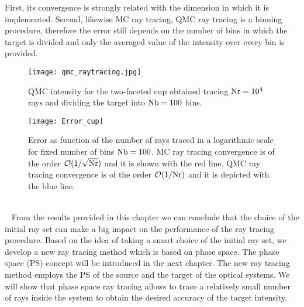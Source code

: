 First, its convergence is strongly related with the dimension in which it is implemented.
Second, likewise MC ray tracing, QMC ray tracing is a binning procedure, therefore the error still depends on the number of bins in which the target is divided and only the averaged value of the intensity over every bin is provided.
\begin{figure}[t]
\begin{center}
    \texttt{[image: qmc\_raytracing.jpg]}
    \caption{QMC intensity for the two-faceted cup obtained tracing $\textrm{Nr}=10^4$ rays and dividing the target into $\textrm{Nb}=100$ bins.}
    \label{fig:qmc_intensity}
\end{center}
  \end{figure}
\begin{figure}[h]\vspace{-5cm}
\begin{center}
    \texttt{[image: Error\_cup]}
    \caption{Error as function of the number of rays traced in a logarithmic scale for fixed number of bins $\textrm{Nb}=100$.
 MC ray tracing convergence is of the order $\mathcal{O}(1/\sqrt{\textrm{Nr}})$ and it is shown with the red line. 
QMC ray tracing convergence is of the order $\mathcal{O}(1/\textrm{Nr})$ and it is depicted with the blue line.}
    \label{fig:Error_cup}
\end{center}
  \end{figure}
 \\\ \indent
From the results provided in this chapter we can conclude that the choice of the initial ray set can make a big impact on the performance of the ray tracing procedure. 
Based on the idea of taking a smart choice of the initial ray set, we develop a new ray tracing method which is based on phase space. 
The phase space (PS) concept will be introduced in the next chapter. The new ray tracing method employs the PS of the source and the target of the optical systems.
We will show that phase space ray tracing allows to trace a relatively small number of rays inside the system to obtain the desired accuracy of the target intensity. 





















